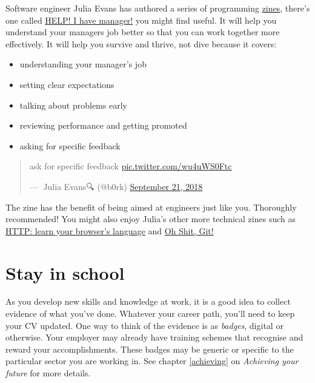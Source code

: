 \documentclass[
]{book}
\providecommand{\tightlist}{%
  \setlength{\itemsep}{0pt}\setlength{\parskip}{0pt}}
\begin{document}
Software engineer Julia Evans has authored a series of programming \href{https://en.wikipedia.org/wiki/Zine}{zines}, there's one called \href{https://wizardzines.com/zines/manager/}{HELP! I have manager!} \citep{helpihaveamanager} you might find useful. It will help you understand your managers job better so that you can work together more effectively. It will help you survive and thrive, not dive because it covers:

\begin{itemize}
\tightlist
\item
  understanding your manager's job
\item
  setting clear expectations
\item
  talking about problems early
\item
  reviewing performance and getting promoted
\item
  asking for specific feedback
\end{itemize}

\begin{quote}
ask for specific feedback
\href{https://t.co/wu4uWS0Ftc}{pic.twitter.com/wu4uWS0Ftc}

--- 🔎Julia Evans🔍 (@b0rk) \href{https://twitter.com/b0rk/status/1043277965394681856}{September 21,
2018}
\end{quote}

The zine has the benefit of being aimed at engineers just like you. Thoroughly recommended! You might also enjoy Julia's other more technical zines such as \href{https://wizardzines.com/zines/http/}{HTTP: learn your browser's language} \citep{browserslanguage} and \href{https://wizardzines.com/zines/oh-shit-git/}{Oh Shit, Git!} \citep{ohshitgit}

\hypertarget{neverstoplearning}{%
\section{Stay in school}\label{neverstoplearning}}

As you develop new skills and knowledge at work, it is a good idea to collect evidence of what you've done. Whatever your career path, you'll need to keep your CV updated. One way to think of the evidence is as \emph{badges}, digital or otherwise. Your employer may already have training schemes that recognise and reward your accomplishments. These badges may be generic or specific to the particular sector you are working in. See chapter \ref{achieving} on \emph{Achieving your future} for more details.
\end{document}
